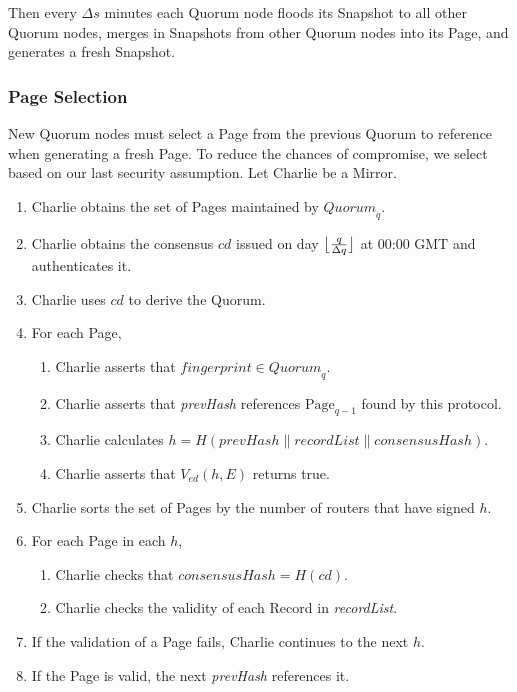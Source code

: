 \documentclass{sig-alternate}
\DeclarePairedDelimiter{\floor}{\lfloor}{\rfloor}
\newcommand*\concat{\mathbin{\|}}
\begin{document}
Then every $ \Delta s $ minutes each Quorum node floods its Snapshot to all other Quorum nodes, merges in Snapshots from other Quorum nodes into its Page, and generates a fresh Snapshot.

\subsubsection{Page Selection}

New Quorum nodes must select a Page from the previous Quorum to reference when generating a fresh Page. To reduce the chances of compromise, we select based on our last security assumption. Let Charlie be a Mirror.

\begin{enumerate}
	\item Charlie obtains the set of Pages maintained by $ \mathit{Quorum}_{q} $.
	\item Charlie obtains the consensus $ \mathit{cd} $ issued on day $ \floor[\big]{\frac{q}{\Delta q}} $ at 00:00 GMT and authenticates it.
	\item Charlie uses $ \mathit{cd} $ to derive the Quorum.
	\item For each Page,
		\begin{enumerate}
			\item Charlie asserts that $ \mathit{fingerprint} \in \mathit{Quorum}_{q} $.
			\item Charlie asserts that \emph{prevHash} references $ \mathrm{Page}_{q-1} $ found by this protocol.
			\item Charlie calculates $ h = H(\mathit{prevHash} \concat \mathit{recordList} \concat \mathit{consensusHash}) $.
			\item Charlie asserts that $ V_{\mathit{ed}}(h, E) $ returns true.
		\end{enumerate}
	\item Charlie sorts the set of Pages by the number of routers that have signed $ h $.
	\newpage
	\item For each Page in each $ h $,
		\begin{enumerate}
			\item Charlie checks that $ \mathit{consensusHash} = H(\mathit{cd}) $.
			\item Charlie checks the validity of each Record in \emph{recordList}.
		\end{enumerate}
	\item If the validation of a Page fails, Charlie continues to the next $ h $.
	\item If the Page is valid, the next \emph{prevHash} references it.
\end{enumerate}
\end{document}
